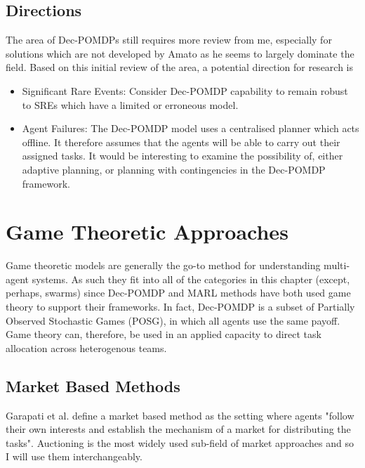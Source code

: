 \documentclass[preprint,8pt]{report}
\begin{document}
\subsection{Directions}

The area of Dec-POMDPs still requires more review from me, especially for solutions which are not developed by Amato as he seems to largely dominate the field. Based on this initial review of the area, a potential direction for research is

\begin{itemize}
    \item Significant Rare Events: Consider Dec-POMDP capability to remain robust to SREs which have a limited or erroneous model.
    \item Agent Failures: The Dec-POMDP model uses a centralised planner which acts offline. It therefore assumes that the agents will be able to carry out their assigned tasks. It would be interesting to examine the possibility of, either adaptive planning, or planning with contingencies in the Dec-POMDP framework.
\end{itemize}

\section{Game Theoretic Approaches}

Game theoretic models are generally the go-to method for understanding multi-agent systems. As such they fit into all of the categories in this chapter (except, perhaps, swarms) since Dec-POMDP and MARL methods have both used game theory to support their frameworks. In fact, Dec-POMDP is a subset of Partially Observed Stochastic Games (POSG), in which all agents use the same payoff. Game theory can, therefore, be used in an applied capacity to direct task allocation across heterogenous teams.

\subsection{Market Based Methods}

Garapati et al. \cite{Garapati2018AMissions} define a market based method as the setting where agents "follow their own interests and establish the mechanism of a market for distributing the tasks". Auctioning is the most widely used sub-field of market approaches and so I will use them interchangeably. 
\end{document}
